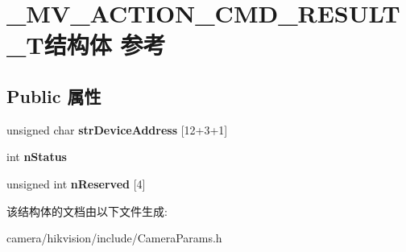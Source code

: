 \hypertarget{struct___m_v___a_c_t_i_o_n___c_m_d___r_e_s_u_l_t___t}{}\section{\+\_\+\+M\+V\+\_\+\+A\+C\+T\+I\+O\+N\+\_\+\+C\+M\+D\+\_\+\+R\+E\+S\+U\+L\+T\+\_\+\+T结构体 参考}
\label{struct___m_v___a_c_t_i_o_n___c_m_d___r_e_s_u_l_t___t}
\subsection*{Public 属性}
\begin{DoxyCompactItemize}
\item 
\mbox{\label{struct___m_v___a_c_t_i_o_n___c_m_d___r_e_s_u_l_t___t_a923564eb4a6ab038c643894442363c3b}} 
unsigned char {\bfseries str\+Device\+Address} \mbox{[}12+3+1\mbox{]}
\item 
\mbox{\label{struct___m_v___a_c_t_i_o_n___c_m_d___r_e_s_u_l_t___t_a2d617aa5f2977267f1db9195460e9e27}} 
int {\bfseries n\+Status}
\item 
\mbox{\label{struct___m_v___a_c_t_i_o_n___c_m_d___r_e_s_u_l_t___t_a34af86a0cdbfa2f7d01de559f1358f7b}} 
unsigned int {\bfseries n\+Reserved} \mbox{[}4\mbox{]}
\end{DoxyCompactItemize}


该结构体的文档由以下文件生成\+:\begin{DoxyCompactItemize}
\item 
camera/hikvision/include/Camera\+Params.\+h\end{DoxyCompactItemize}

